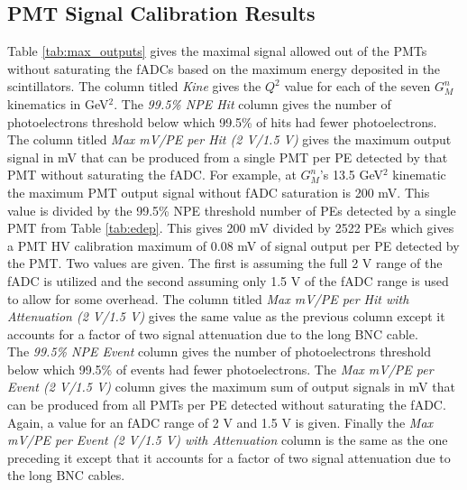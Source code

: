 \documentclass[10pt]{article}
\begin{document}
\subsection{PMT Signal Calibration Results}
	
	Table \ref{tab:max_outputs} gives the maximal signal allowed out of the PMTs without saturating the fADCs based on the maximum energy deposited in the scintillators. The column titled \textit{Kine} gives the $Q^2$ value for each of the seven $G_M^n$ kinematics in GeV$^2$. The \textit{99.5\% NPE Hit} column gives the number of photoelectrons threshold below which 99.5\% of hits had fewer photoelectrons. The column titled \textit{Max mV/PE per Hit (2 V/1.5 V)} gives the maximum output signal in mV that can be produced from a single PMT per PE detected by that PMT without saturating the fADC. For example, at $G_M^n$'s 13.5 GeV$^2$ kinematic the maximum PMT output signal without fADC saturation is 200 mV. This value is divided by the 99.5\% NPE threshold number of PEs detected by a single PMT from Table \ref{tab:edep}. This gives 200 mV divided by 2522 PEs which gives a PMT HV calibration maximum of 0.08 mV of signal output per PE detected by the PMT. Two values are given. The first is assuming the full 2 V range of the fADC is utilized and the second assuming only 1.5 V of the fADC range is used to allow for some overhead. The column titled \textit{Max mV/PE per Hit with Attenuation (2 V/1.5 V)} gives the same value as the previous column except it accounts for a factor of two signal attenuation due to the long BNC cable. \\
	 
	 The \textit{99.5\% NPE Event} column gives the number of photoelectrons threshold below which 99.5\% of events had fewer photoelectrons. The \textit{Max mV/PE per Event (2 V/1.5 V)} column gives the maximum sum of output signals in mV that can be produced from all PMTs per PE detected without saturating the fADC. Again, a value for an fADC range of 2 V and 1.5 V is given. Finally the \textit{Max mV/PE per Event (2 V/1.5 V) with Attenuation} column is the same as the one preceding it except that it accounts for a factor of two signal attenuation due to the long BNC cables.\\
	
\end{document}
